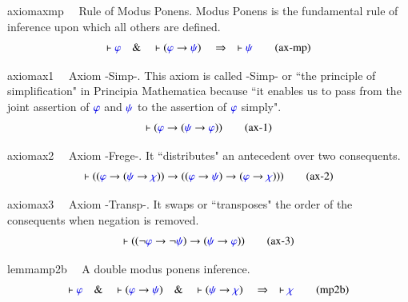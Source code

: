 \begin{restatable}{axiom}{axmp}~~ Rule of Modus Ponens.  
Modus Ponens is the fundamental rule of inference upon which all others are defined.
\begin{align}
\vdash \mw{\varphi}\quad\&\quad \vdash ( \mw{\varphi} \rightarrow \mw{\psi}
    )\quad\Rightarrow\quad \vdash \mw{\psi}\label{eq:ax-mp}\tag{ax-mp}
\end{align}
\end{restatable}

\begin{restatable}{axiom}{ax1}~~ Axiom -Simp-.  This axiom is called -Simp- or ``the principle of
     simplification" in Principia Mathematica because ``it enables us to pass from the joint
     assertion of $\mw{\varphi}$ and $\mw{\psi}$ to the assertion of
$\mw{\varphi}$ simply".  
\begin{align}
\vdash ( \mw{\varphi} \rightarrow ( \mw{\psi} \rightarrow \mw{\varphi} )
    )\label{eq:ax-1}\tag{ax-1}
\end{align}
\end{restatable}

\begin{restatable}{axiom}{ax2}~~ Axiom -Frege-.    It ``distributes" an antecedent over two
     consequents.  
\begin{align}
\vdash ( ( \mw{\varphi} \rightarrow ( \mw{\psi} \rightarrow \mw{\chi} ) )
    \rightarrow ( ( \mw{\varphi} \rightarrow \mw{\psi} ) \rightarrow (
    \mw{\varphi} \rightarrow \mw{\chi} ) ) )\label{eq:ax-2}\tag{ax-2}
\end{align}
\end{restatable}

\begin{restatable}{axiom}{ax3}~~ Axiom -Transp-.   It swaps or ``transposes" the order of the
     consequents when negation is removed.  
\begin{align}
\vdash ( ( \lnot \mw{\varphi} \rightarrow \lnot \mw{\psi} ) \rightarrow (
    \mw{\psi} \rightarrow \mw{\varphi} ) )\label{eq:ax-3}\tag{ax-3}
\end{align}
\end{restatable}

\begin{restatable}{lemma}{mp2b}~~ A double modus ponens inference.  
\begin{align}
\vdash \mw{\varphi}\quad\&\quad \vdash ( \mw{\varphi} \rightarrow \mw{\psi}
    )\quad\&\quad \vdash ( \mw{\psi} \rightarrow \mw{\chi}
    )\quad\Rightarrow\quad \vdash \mw{\chi}\label{eq:mp2b}\tag{mp2b}
\end{align}
\end{restatable}

